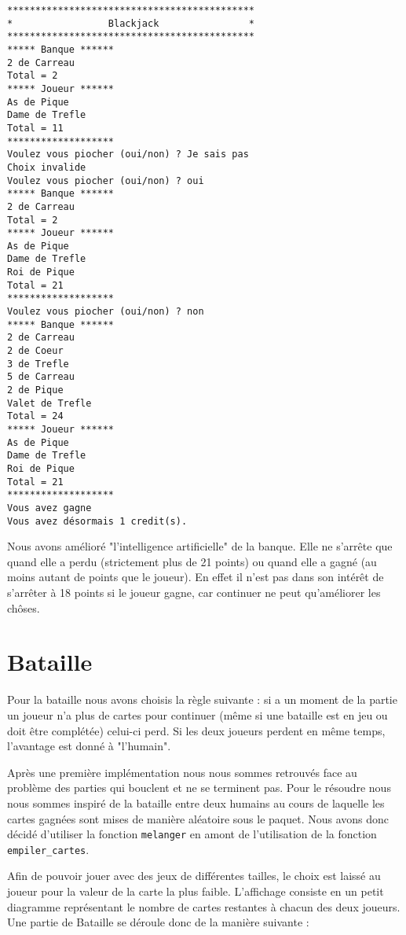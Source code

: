 \documentclass[a4paper]{article}
\begin{document}
\begin{verbatim}
********************************************
*                 Blackjack                *
********************************************
***** Banque ******
2 de Carreau
Total = 2
***** Joueur ******
As de Pique
Dame de Trefle
Total = 11
*******************
Voulez vous piocher (oui/non) ? Je sais pas
Choix invalide
Voulez vous piocher (oui/non) ? oui
***** Banque ******
2 de Carreau
Total = 2
***** Joueur ******
As de Pique
Dame de Trefle
Roi de Pique
Total = 21
*******************
Voulez vous piocher (oui/non) ? non
***** Banque ******
2 de Carreau
2 de Coeur
3 de Trefle
5 de Carreau
2 de Pique
Valet de Trefle
Total = 24
***** Joueur ******
As de Pique
Dame de Trefle
Roi de Pique
Total = 21
*******************
Vous avez gagne
Vous avez désormais 1 credit(s).
\end{verbatim}
  
  Nous avons amélioré "l'intelligence artificielle" de la banque. Elle ne s'arrête que quand elle a perdu (strictement plus de 21 points) ou quand elle a gagné (au moins autant de points que le joueur). En effet il n'est pas dans son intérêt de s'arrêter à 18 points si le joueur gagne, car continuer ne peut qu'améliorer les chôses. 

  \section{Bataille}

  Pour la bataille nous avons choisis la règle suivante : si a un moment de la partie un joueur n'a plus de cartes pour continuer (même si une bataille est en jeu ou doit être complétée) celui-ci perd. Si les deux joueurs perdent en même temps, l'avantage est donné à "l'humain".
  
  Après une première implémentation nous nous sommes retrouvés face au problème des parties qui bouclent et ne se terminent pas. Pour le résoudre nous nous sommes inspiré de la bataille entre deux humains au cours de laquelle les cartes gagnées sont mises de manière aléatoire sous le paquet. Nous avons donc décidé d'utiliser la fonction \verb|melanger| en amont de l'utilisation de la fonction \verb|empiler_cartes|.

  Afin de pouvoir jouer avec des jeux de différentes tailles, le choix est laissé au joueur pour la valeur de la carte la plus faible. L'affichage consiste en un petit diagramme représentant le nombre de cartes restantes à chacun des deux joueurs. Une partie de Bataille se déroule donc de la manière suivante :
\end{document}
